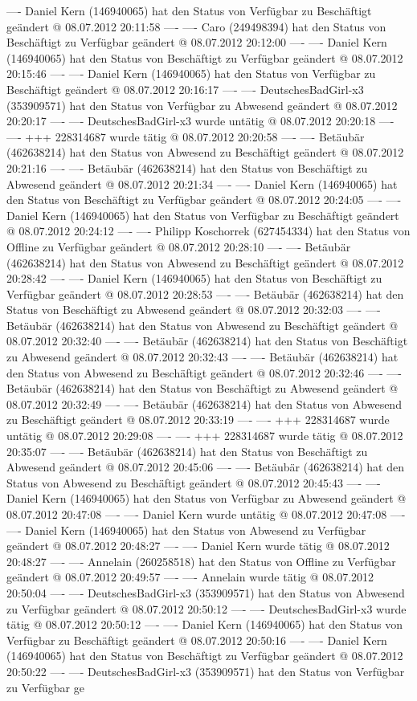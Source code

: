 ---- Daniel  Kern (146940065) hat den Status von Verfügbar zu Beschäftigt geändert @ 08.07.2012 20:11:58 ----
---- Caro (249498394) hat den Status von Beschäftigt zu Verfügbar geändert @ 08.07.2012 20:12:00 ----
---- Daniel  Kern (146940065) hat den Status von Beschäftigt zu Verfügbar geändert @ 08.07.2012 20:15:46 ----
---- Daniel  Kern (146940065) hat den Status von Verfügbar zu Beschäftigt geändert @ 08.07.2012 20:16:17 ----
---- DeutschesBadGirl-x3 (353909571) hat den Status von Verfügbar zu Abwesend geändert @ 08.07.2012 20:20:17 ----
---- DeutschesBadGirl-x3 wurde untätig @ 08.07.2012 20:20:18 ----
---- +++ 228314687 wurde tätig @ 08.07.2012 20:20:58 ----
---- Betäubär (462638214) hat den Status von Abwesend zu Beschäftigt geändert @ 08.07.2012 20:21:16 ----
---- Betäubär (462638214) hat den Status von Beschäftigt zu Abwesend geändert @ 08.07.2012 20:21:34 ----
---- Daniel  Kern (146940065) hat den Status von Beschäftigt zu Verfügbar geändert @ 08.07.2012 20:24:05 ----
---- Daniel  Kern (146940065) hat den Status von Verfügbar zu Beschäftigt geändert @ 08.07.2012 20:24:12 ----
---- Philipp Koschorrek (627454334) hat den Status von Offline zu Verfügbar geändert @ 08.07.2012 20:28:10 ----
---- Betäubär (462638214) hat den Status von Abwesend zu Beschäftigt geändert @ 08.07.2012 20:28:42 ----
---- Daniel  Kern (146940065) hat den Status von Beschäftigt zu Verfügbar geändert @ 08.07.2012 20:28:53 ----
---- Betäubär (462638214) hat den Status von Beschäftigt zu Abwesend geändert @ 08.07.2012 20:32:03 ----
---- Betäubär (462638214) hat den Status von Abwesend zu Beschäftigt geändert @ 08.07.2012 20:32:40 ----
---- Betäubär (462638214) hat den Status von Beschäftigt zu Abwesend geändert @ 08.07.2012 20:32:43 ----
---- Betäubär (462638214) hat den Status von Abwesend zu Beschäftigt geändert @ 08.07.2012 20:32:46 ----
---- Betäubär (462638214) hat den Status von Beschäftigt zu Abwesend geändert @ 08.07.2012 20:32:49 ----
---- Betäubär (462638214) hat den Status von Abwesend zu Beschäftigt geändert @ 08.07.2012 20:33:19 ----
---- +++ 228314687 wurde untätig @ 08.07.2012 20:29:08 ----
---- +++ 228314687 wurde tätig @ 08.07.2012 20:35:07 ----
---- Betäubär (462638214) hat den Status von Beschäftigt zu Abwesend geändert @ 08.07.2012 20:45:06 ----
---- Betäubär (462638214) hat den Status von Abwesend zu Beschäftigt geändert @ 08.07.2012 20:45:43 ----
---- Daniel  Kern (146940065) hat den Status von Verfügbar zu Abwesend geändert @ 08.07.2012 20:47:08 ----
---- Daniel  Kern wurde untätig @ 08.07.2012 20:47:08 ----
---- Daniel  Kern (146940065) hat den Status von Abwesend zu Verfügbar geändert @ 08.07.2012 20:48:27 ----
---- Daniel  Kern wurde tätig @ 08.07.2012 20:48:27 ----
---- Annelain (260258518) hat den Status von Offline zu Verfügbar geändert @ 08.07.2012 20:49:57 ----
---- Annelain wurde tätig @ 08.07.2012 20:50:04 ----
---- DeutschesBadGirl-x3 (353909571) hat den Status von Abwesend zu Verfügbar geändert @ 08.07.2012 20:50:12 ----
---- DeutschesBadGirl-x3 wurde tätig @ 08.07.2012 20:50:12 ----
---- Daniel  Kern (146940065) hat den Status von Verfügbar zu Beschäftigt geändert @ 08.07.2012 20:50:16 ----
---- Daniel  Kern (146940065) hat den Status von Beschäftigt zu Verfügbar geändert @ 08.07.2012 20:50:22 ----
---- DeutschesBadGirl-x3 (353909571) hat den Status von Verfügbar zu Verfügbar ge